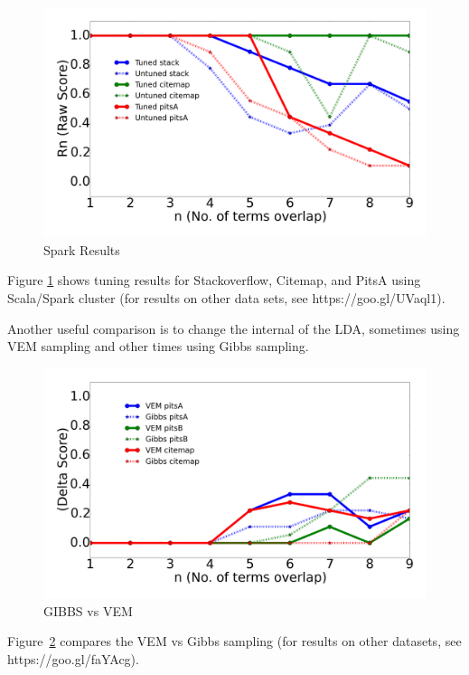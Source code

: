 \documentclass[twocolumn,5p,sort&compress]{elsarticle}
\theoremstyle{break}
\begin{document}
\begin{figure}[!b]
  \captionsetup{justification=centering}
  \includegraphics[width=\linewidth]{./fig/spark.png}
  \caption{Spark Results}
  \label{python_spark}
\end{figure}

Figure \ref{python_spark} shows tuning results for Stackoverflow, Citemap, and PitsA 
   using Scala/Spark cluster (for results on other data sets, see https://goo.gl/UVaql1).
   
  Another useful comparison is to change the internal of the LDA, sometimes using VEM sampling and other times using Gibbs sampling.


\begin{figure}[!htbp]
  \captionsetup{justification=centering}
  \includegraphics[width=\linewidth]{./fig/gibbs_vem1.png}
  \caption{GIBBS vs VEM}
  \label{gibbs_vem}
\end{figure}


  Figure~\ref{gibbs_vem} compares the  VEM vs Gibbs sampling (for results on other datasets, see https://goo.gl/faYAcg).
   
\end{document}
